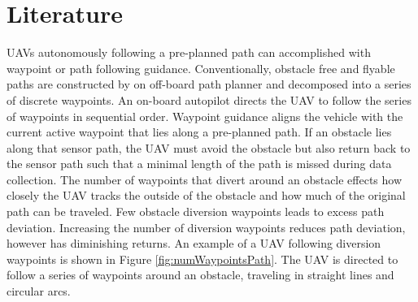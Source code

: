 \documentclass[conf]{new-aiaa}
\begin{document}
\section{Literature}
UAVs autonomously following a pre-planned path can accomplished with waypoint or path following guidance. Conventionally, obstacle free and flyable paths are constructed by on off-board path planner and decomposed into a series of discrete waypoints. An on-board autopilot directs the UAV to follow the series of waypoints in sequential order. Waypoint guidance aligns the vehicle with the current active waypoint that lies along a pre-planned path. If an obstacle lies along that sensor path, the UAV must avoid the obstacle but also return back to the sensor path such that a minimal length of the path is missed during data collection. The number of waypoints that divert around an obstacle effects how closely the UAV tracks the outside of the obstacle and how much of the original path can be traveled. Few obstacle diversion waypoints leads to excess path deviation. Increasing the number of diversion waypoints reduces path deviation, however has diminishing returns. An example of a UAV following diversion waypoints is shown in Figure \ref{fig:numWaypointsPath}. The UAV is directed to follow a series of waypoints around an obstacle, traveling in straight lines and circular arcs.



%
\end{document}
